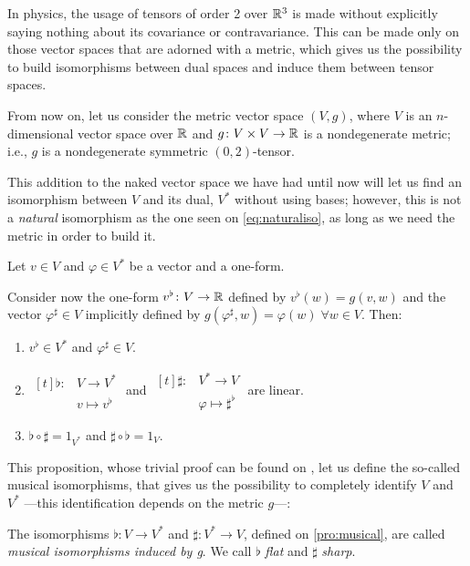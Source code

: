In physics, the usage of tensors of order 2 over $\mathbb{R}^3$ is made without explicitly saying nothing about its covariance or contravariance. This can be made only on those vector spaces that are adorned with a metric, which gives us the possibility to build isomorphisms between dual spaces and induce them between tensor spaces.

From now on, let us consider the metric vector space $(V, g)$, where $V$ is an $n$-dimensional vector space over $\mathbb{R}$ and $g \colon V \times V \to \mathbb{R}$ is a nondegenerate metric; i.e., $g$ is a nondegenerate symmetric $(0,2)$-tensor.

This addition to the naked vector space we have had until now will let us find an isomorphism between $V$ and its dual, $V^*$ without using bases; however, this is not a \emph{natural} isomorphism as the one seen on \autoref{eq:naturaliso}, as long as we need the metric in order to build it.

\begin{proposition}
	\label{pro:musical}
	Let $v \in V$ and $\varphi \in V^*$ be a vector and a one-form.
	
	Consider now the one-form $v^\flat \colon V \to \mathbb{R}$ defined by $v^\flat(w) = g(v, w)$ and the vector $\varphi^\sharp \in V$ implicitly defined by $g(\varphi^\sharp, w) = \varphi(w) \;\forall w \in V$. Then:
	\begin{enumerate}
		\item $v^\flat \in V^*$ and $\varphi^\sharp \in V$.
		\item $\begin{aligned}[t]
			\flat \colon &V \to V^* \\
			&v \mapsto v^\flat
		\end{aligned}$ and $\begin{aligned}[t]
			\sharp \colon &V^* \to V \\
			&\varphi \mapsto \sharp^\flat
		\end{aligned}$ are linear.
		\item $\flat \circ \sharp = 1_{V^*}$ and $\sharp \circ \flat = 1_V$.
	\end{enumerate}	
\end{proposition}

This proposition, whose trivial proof can be found on \cite[Proposition 9.30]{romero86}, let us define the so-called musical isomorphisms, that gives us the possibility to completely identify $V$ and $V^*$ ---this identification depends on the metric $g$---:

\begin{definition}
	The isomorphisms $\flat \colon V \to V^*$ and $\sharp \colon V^* \to V$, defined on \autoref{pro:musical}, are called \emph{musical isomorphisms induced by g}. We call $\flat$ \emph{flat} and $\sharp$ \emph{sharp}.
\end{definition}

